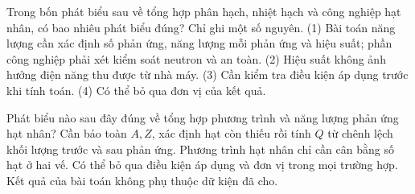 \begin{ex}
Trong bốn phát biểu sau về tổng hợp phân hạch, nhiệt hạch và công nghiệp hạt nhân, có bao nhiêu phát biểu đúng? Chỉ ghi một số nguyên. (1) Bài toán năng lượng cần xác định số phản ứng, năng lượng mỗi phản ứng và hiệu suất; phần công nghiệp phải xét kiểm soát neutron và an toàn. (2) Hiệu suất không ảnh hưởng điện năng thu được từ nhà máy. (3) Cần kiểm tra điều kiện áp dụng trước khi tính toán. (4) Có thể bỏ qua đơn vị của kết quả.
\end{ex}

\begin{ex}
Phát biểu nào sau đây đúng về tổng hợp phương trình và năng lượng phản ứng hạt nhân?
\choice
{\True Cần bảo toàn $A,Z$, xác định hạt còn thiếu rồi tính $Q$ từ chênh lệch khối lượng trước và sau phản ứng.}
{Phương trình hạt nhân chỉ cần cân bằng số hạt ở hai vế.}
{Có thể bỏ qua điều kiện áp dụng và đơn vị trong mọi trường hợp.}
{Kết quả của bài toán không phụ thuộc dữ kiện đã cho.}
\end{ex}

